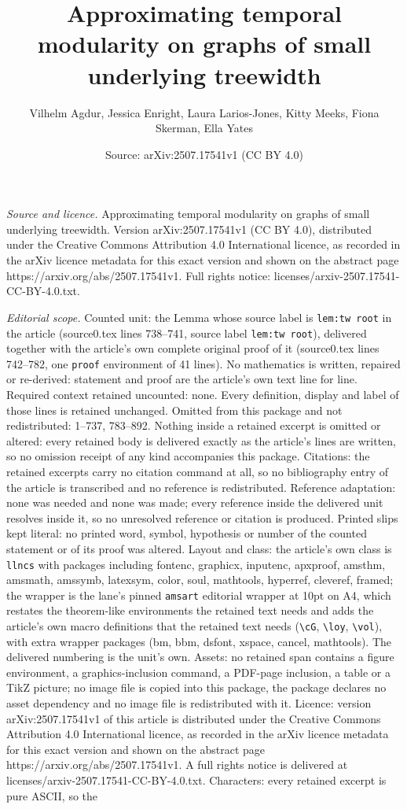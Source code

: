 \documentclass[10pt,a4paper]{amsart}
\title[Approximating temporal modularity on graphs of small underly]{Approximating temporal modularity on graphs of small underlying treewidth}
\author{Vilhelm Agdur, Jessica Enright, Laura Larios-Jones, Kitty Meeks, Fiona Skerman, Ella Yates}
\date{Source: arXiv:2507.17541v1 (CC BY 4.0)}
\begin{document}
\maketitle

\noindent\emph{Source and licence.} Approximating temporal modularity on graphs of small underlying treewidth. Version arXiv:2507.17541v1 (CC BY 4.0), distributed under the Creative Commons Attribution 4.0 International licence, as recorded in the arXiv licence metadata for this exact version and shown on the abstract page https://arxiv.org/abs/2507.17541v1. Full rights notice: licenses/arxiv-2507.17541-CC-BY-4.0.txt.\par\smallskip

\noindent\textit{Editorial scope.} Counted unit: the Lemma whose source label is \texttt{lem:tw root} in the article (source0.tex lines 738--741, source label \texttt{lem:tw root}), delivered together with the article's own complete original proof of it (source0.tex lines 742--782, one \texttt{proof} environment of 41 lines). No mathematics is written, repaired or re-derived: statement and proof are the article's own text line for line. Required context retained uncounted: none. Every definition, display and label of those lines is retained unchanged. Omitted from this package and not redistributed: 1--737, 783--892. Nothing inside a retained excerpt is omitted or altered: every retained body is delivered exactly as the article's lines are written, so no omission receipt of any kind accompanies this package. Citations: the retained excerpts carry no citation command at all, so no bibliography entry of the article is transcribed and no reference is redistributed. Reference adaptation: none was needed and none was made; every reference inside the delivered unit resolves inside it, so no unresolved reference or citation is produced. Printed slips kept literal: no printed word, symbol, hypothesis or number of the counted statement or of its proof was altered. Layout and class: the article's own class is \texttt{llncs} with packages including fontenc, graphicx, inputenc, apxproof, amsthm, amsmath, amssymb, latexsym, color, soul, mathtools, hyperref, cleveref, framed; the wrapper is the lane's pinned \texttt{amsart} editorial wrapper at 10pt on A4, which restates the theorem-like environments the retained text needs and adds the article's own macro definitions that the retained text needs (\texttt{\textbackslash cG}, \texttt{\textbackslash loy}, \texttt{\textbackslash vol}), with extra wrapper packages (bm, bbm, dsfont, xspace, cancel, mathtools). The delivered numbering is the unit's own. Assets: no retained span contains a figure environment, a graphics-inclusion command, a PDF-page inclusion, a table or a TikZ picture; no image file is copied into this package, the package declares no asset dependency and no image file is redistributed with it. Licence: version arXiv:2507.17541v1 of this article is distributed under the Creative Commons Attribution 4.0 International licence, as recorded in the arXiv licence metadata for this exact version and shown on the abstract page https://arxiv.org/abs/2507.17541v1. A full rights notice is delivered at licenses/arxiv-2507.17541-CC-BY-4.0.txt. Characters: every retained excerpt is pure ASCII, so the 
\end{document}
